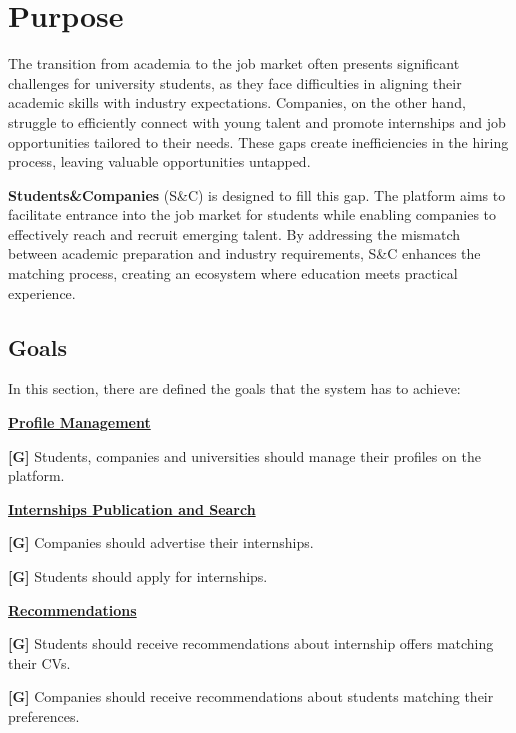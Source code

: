 
\section{Purpose}
The transition from academia to the job market often presents significant challenges for university students, as they face difficulties in aligning their academic skills with industry expectations. Companies, on the other hand, struggle to efficiently connect with young talent and promote internships and job opportunities tailored to their needs. These gaps create inefficiencies in the hiring process, leaving valuable opportunities untapped.

\textbf{Students\&Companies} (S\&C) is designed to fill this gap. The platform aims to facilitate entrance into the job market for students while enabling companies to effectively reach and recruit emerging talent. By addressing the mismatch between academic preparation and industry requirements, S\&C enhances the matching process, creating an ecosystem where education meets practical experience.
\label{sec:purpose}%

\subsection{Goals}
\label{subsec:goals}%
\setcounter{g}{1}
\newcommand{\cg}{\theg\stepcounter{g}}

\setcounter{subg}{1}
\newcommand{\csubg}{\thesubg\stepcounter{subg}}
\newcommand{\resetsubg}{\setcounter{subg}{1}}


In this section, there are defined the goals that the system has to achieve:

    \uline{\textbf{Profile Management}}

        \textbf{[G\cg]} Students, companies and universities should manage their profiles on the platform.

    \uline{\textbf{Internships Publication and Search}}
        
        \textbf{[G\cg]} Companies should advertise their internships.

        \textbf{[G\cg]} Students should apply for internships.

    \uline{\textbf{Recommendations}}
            
        \textbf{[G\cg]} Students should receive recommendations about internship offers matching their CVs.

        \textbf{[G\cg]} Companies should receive recommendations about students matching their preferences.

